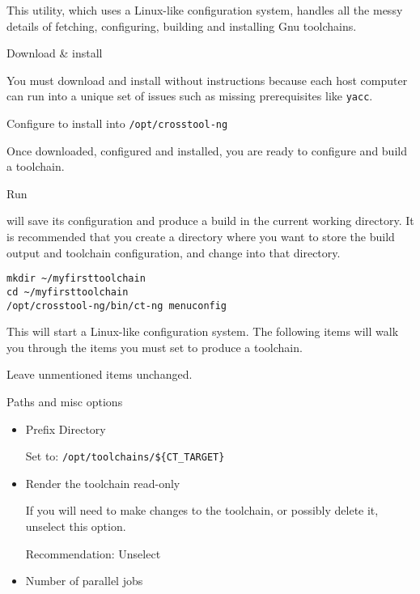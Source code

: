 This utility, which uses a Linux-like configuration system, handles
all the messy details of fetching, configuring, building and
installing Gnu toolchains.

\begin{description}
\item Download \& install \ctng

  You must download and install \ctng without instructions because
  each host computer can run into a unique set of issues such as
  missing prerequisites like \texttt{yacc}.

  Configure \ctng to install into \texttt{/opt/crosstool-ng}

  Once downloaded, configured and installed, you are ready to
  configure and build a toolchain.

  \item Run \ctng

    \ctng will save its configuration and produce a build in the
    current working directory.  It is recommended that you create a
    directory where you want to store the build output and toolchain
    configuration, and change into that directory.

\begin{verbatim}
mkdir ~/myfirsttoolchain
cd ~/myfirsttoolchain
/opt/crosstool-ng/bin/ct-ng menuconfig
\end{verbatim}

    This will start a Linux-like configuration system.  The following
    items will walk you through the items you must set to produce a
    toolchain.

    Leave unmentioned items unchanged.

    \begin{description}

    \item Paths and misc options

      \begin{itemize}
      \item{Prefix Directory}

        Set to: \texttt{/opt/toolchains/\$\{CT\_TARGET\}}

      \item{Render the toolchain read-only}

        If you will need to make changes to the toolchain, or possibly
        delete it, unselect this option.

        Recommendation: Unselect

      \item{Number of parallel jobs}


\end{itemize}
\end{description}
\end{description}
